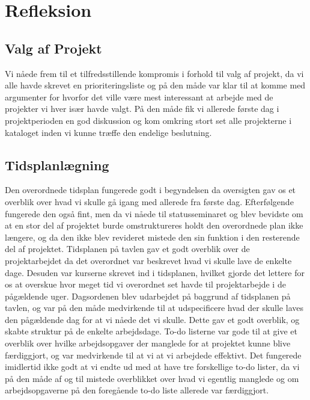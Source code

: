 \section{Refleksion}

\subsection{Valg af Projekt}
Vi nåede frem til et tilfredsstillende kompromis i forhold til valg af projekt, da vi alle havde skrevet en prioriteringsliste og på den måde var klar til at komme med argumenter for hvorfor det ville være mest interessant at arbejde med de projekter vi hver især havde valgt. På den måde fik vi allerede første dag i projektperioden en god diskussion og kom omkring stort set alle projekterne i kataloget inden vi kunne træffe den endelige beslutning. 

\subsection{Tidsplanlægning}
Den overordnede tidsplan fungerede godt i begyndelsen da oversigten gav os et overblik over hvad vi skulle gå igang med allerede fra første dag. Efterfølgende fungerede den også fint, men da vi nåede til statusseminaret og blev bevidste om at en stor del af projektet burde omstruktureres holdt den overordnede plan ikke længere, og da den ikke blev revideret mistede den sin funktion i den resterende del af projektet. 
Tidsplanen på tavlen gav et godt overblik over de projektarbejdet da det overordnet var beskrevet hvad vi skulle lave de enkelte dage. Desuden var kurserne skrevet ind i tidsplanen, hvilket gjorde det lettere for os at overskue hvor meget tid vi overordnet set havde til projektarbejde i de pågældende uger. 
Dagsordenen blev udarbejdet på baggrund af tidsplanen på tavlen, og var på den måde medvirkende til at udspecificere hvad der skulle laves den pågældende dag for at vi nåede det vi skulle. Dette gav et godt overblik, og skabte struktur på de enkelte arbejdsdage.
To-do listerne var gode til at give et overblik over hvilke arbejdsopgaver der manglede for at projektet kunne blive færdiggjort, og var medvirkende til at vi at vi arbejdede effektivt. Det fungerede imidlertid ikke godt at vi endte ud med at have tre forskellige to-do lister, da vi på den måde af og til mistede overblikket over hvad vi egentlig manglede og om arbejdsopgaverne på den foregående to-do liste allerede var færdiggjort.

